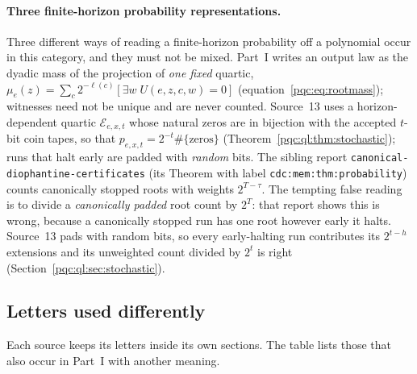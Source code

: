 \documentclass[11pt,letterpaper]{article}
\numberwithin{equation}{section}
\theoremstyle{definition}
\theoremstyle{remark}
\newcommand{\code}[1]{\nolinkurl{#1}}
\newcommand{\cE}{\mathcal E}
\begin{document}
\paragraph{Three finite-horizon probability representations.}
Three different ways of reading a finite-horizon probability off a polynomial
occur in this category, and they must not be mixed. Part~I writes an output law
as the dyadic mass of the projection of \emph{one fixed} quartic,
$\mu_e(z)=\sum_c2^{-\ell(c)}[\exists w\;U(e,z,c,w)=0]$
(equation~\eqref{pqc:eq:rootmass}); witnesses need not be unique and are never
counted. Source~13 uses a horizon-dependent quartic $\cE_{e,x,t}$ whose natural
zeros are in bijection with the accepted $t$-bit coin tapes, so that
$p_{e,x,t}=2^{-t}\#\{\text{zeros}\}$
(Theorem~\ref{pqc:ql:thm:stochastic}); runs that halt early are padded with
\emph{random} bits. The sibling report \code{canonical-diophantine-certificates}
(its Theorem with label \code{cdc:mem:thm:probability}) counts canonically
stopped roots with weights $2^{T-\tau}$. The tempting false reading is to divide
a \emph{canonically padded} root count by $2^T$: that report shows this is wrong,
because a canonically stopped run has one root however early it halts. Source~13
pads with random bits, so every early-halting run contributes its $2^{t-h}$
extensions and its unweighted count divided by $2^t$ is right
(Section~\ref{pqc:ql:sec:stochastic}).

\subsection{Letters used differently}
\label{pqc:conv:b62-V:letters}
Each source keeps its letters inside its own sections. The table lists those
that also occur in Part~I with another meaning.
\end{document}
